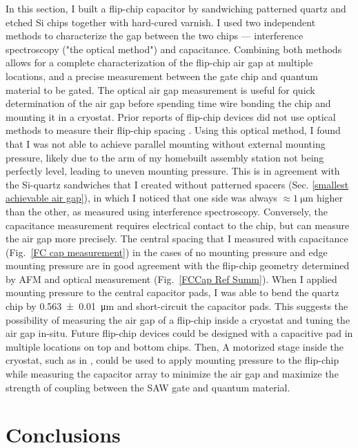 \documentclass[double,12pt,1in,seploa]{beavtex}
\begin{document}
In this section, I built a flip-chip capacitor by sandwiching patterned quartz and etched Si chips together with hard-cured varnish. I used two independent methods to characterize the gap between the two chips — interference spectroscopy ("the optical method") and capacitance. Combining both methods allows for a complete characterization of the flip-chip air gap at multiple locations, and a precise measurement between the gate chip and quantum material to be gated. The optical air gap measurement is useful for quick determination of the air gap before spending time wire bonding the chip and mounting it in a cryostat. Prior reports of flip-chip devices did not use optical methods to measure their flip-chip spacing \cite{beukman_noninvasive_2015, chu_creation_2018,satzinger_quantum_2018,bennaceur_mechanical_2015}. Using this optical method, I found that I was not able to achieve parallel mounting without external mounting pressure, likely due to the arm of my homebuilt assembly station not being perfectly level, leading to uneven mounting pressure. This is in agreement with the Si-quartz sandwiches that I created without patterned spacers (Sec. \ref{smallest achievable air gap}), in which I noticed that one side was always $\approx \SI{1}{\micro\meter}$ higher than the other, as measured using interference spectroscopy. Conversely, the capacitance measurement requires electrical contact to the chip, but can measure the air gap more precisely. The central spacing that I measured with capacitance (Fig.\ \ref{FC cap measurement}) in the cases of no mounting pressure and edge mounting pressure are in good agreement with the flip-chip geometry determined by AFM and optical measurement (Fig.\ \ref{FCCap Ref Summ}). When I applied mounting pressure to the central capacitor pads, I was able to bend the quartz chip by \SI{0.563(10)}{\micro\meter} and short-circuit the capacitor pads. This suggests the possibility of measuring the air gap of a flip-chip inside a cryostat and tuning the air gap in-situ. Future flip-chip devices could be designed with a capacitive pad in multiple locations on top and bottom chips. Then, A motorized stage inside the cryostat, such as in \cite{inbar_quantum_2023}, could be used to apply mounting pressure to the flip-chip while measuring the capacitor array to minimize the air gap and maximize the strength of coupling between the SAW gate and quantum material. 


\chapter{Conclusions}
\end{document}
